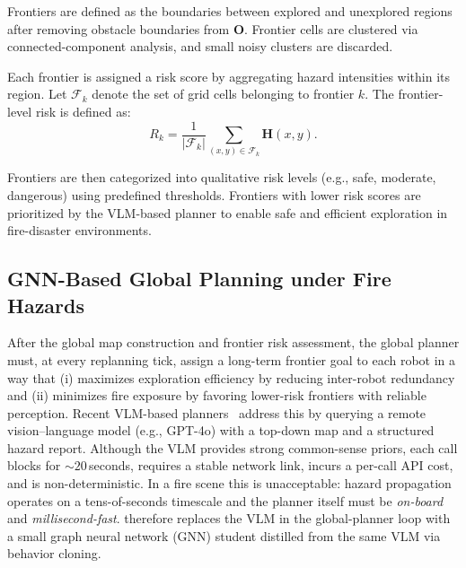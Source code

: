 Frontiers are defined as the boundaries between explored and unexplored regions after removing obstacle boundaries from $\mathbf{O}$. Frontier cells are clustered via connected-component analysis, and small noisy clusters are discarded.

Each frontier is assigned a risk score by aggregating hazard intensities within its region. Let $\mathcal{F}_k$ denote the set of grid cells belonging to frontier $k$. The frontier-level risk is defined as:
\begin{equation}
R_k = \frac{1}{|\mathcal{F}_k|} \sum_{(x,y) \in \mathcal{F}_k} \mathbf{H}(x,y).
\end{equation}

Frontiers are then categorized into qualitative risk levels (e.g., safe, moderate, dangerous) using predefined thresholds. Frontiers with lower risk scores are prioritized by the VLM-based planner to enable safe and efficient exploration in fire-disaster environments.



\subsection{GNN-Based Global Planning under Fire Hazards}
\label{subsec:gnn-planner}
After the global map construction and frontier risk assessment, the global planner must, at every replanning tick, assign a long-term frontier goal to each robot in a way that (i) maximizes exploration efficiency by reducing inter-robot redundancy and (ii) minimizes fire exposure by favoring lower-risk frontiers with reliable perception. Recent VLM-based planners~\cite{11302789} address this by querying a remote vision--language model (e.g., GPT-4o) with a top-down map and a structured hazard report. Although the VLM provides strong common-sense priors, each call blocks for ${\sim}20$\,seconds, requires a stable network link, incurs a per-call API cost, and is non-deterministic. In a fire scene this is unacceptable: hazard propagation operates on a tens-of-seconds timescale and the planner itself must be \emph{on-board} and \emph{millisecond-fast}. \system therefore replaces the VLM in the global-planner loop with a small graph neural network (GNN) student distilled from the same VLM via behavior cloning.

